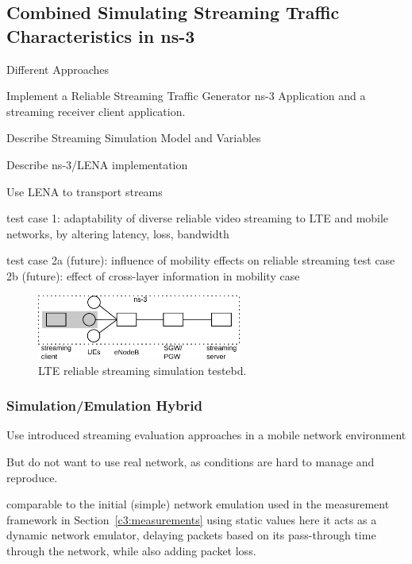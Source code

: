 \subsection{Combined Simulating Streaming Traffic Characteristics in ns-3}
\label{c5:mobilestreamingtestbed}


Different Approaches



Implement a Reliable Streaming Traffic Generator ns-3 Application and a streaming receiver client application.

Describe Streaming Simulation Model and Variables

Describe ns-3/LENA implementation

 Use LENA to transport streams


 test case 1: adaptability of diverse reliable video streaming to LTE and mobile networks, by altering latency, loss, bandwidth

 test case 2a (future): influence of mobility effects on reliable streaming
 test case 2b (future): effect of cross-layer information in mobility case



\begin{figure}[htb]
\centering
\includegraphics[width=0.6\textwidth]{images/streaming-simulation.pdf}
\caption{\gls{LTE} reliable streaming simulation testebd.}
\label{c5:fig:streaming-simulation}
\end{figure}


\subsubsection{Simulation/Emulation Hybrid}


Use introduced streaming evaluation approaches in a mobile network environment

But do not want to use real network, as conditions are hard to manage and reproduce.

comparable to the initial (simple) network emulation used in the measurement framework in Section~\ref{c3:measurements} using static values
here it acts as a dynamic network emulator, delaying packets based on its pass-through time through the network, while also adding packet loss.

